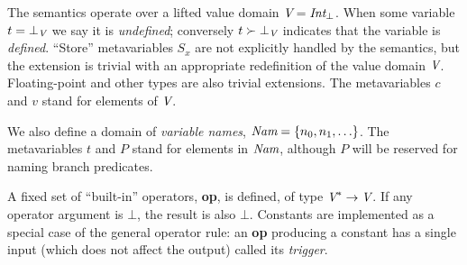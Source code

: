 \documentclass[12pt,titlepage,twoside]{article}
\begin{document}
The semantics operate over a lifted value domain
${\mbox{\em V}}={\mbox{\em Int}}_\bot$. When some variable
$t = \bot_{\mbox{\scriptsize\em V}}$ we say it is
\emph{undefined}; conversely $t\succ\bot_{\mbox{\scriptsize\em V}}$ indicates that the
variable is \emph{defined}.  ``Store'' metavariables $S_x$ are not
explicitly handled by the semantics, but the extension is trivial with
an appropriate redefinition of the value domain ${\mbox{\em V}}$.  Floating-point
and other types are also trivial extensions.  The
metavariables $c$ and $v$ stand for elements of ${\mbox{\em V}}$.

We also define a domain of \emph{variable names},
${\mbox{\em Nam}}=\left\{n_0,n_1,\ldots\right\}$.  The metavariables $t$ and $P$ stand for
elements in ${\mbox{\em Nam}}$, although $P$ will be reserved for naming branch predicates.

A fixed set of ``built-in'' operators, \textbf{op}, is defined,
of type ${\mbox{\em V}}^* \to {\mbox{\em V}}$.  If any operator argument is $\bot$, the
result is also $\bot$.  Constants are implemented as a special case of
the general operator rule: an \textbf{op} producing a constant has a
single input (which does not affect the output) called its \emph{trigger}.
\end{document}
